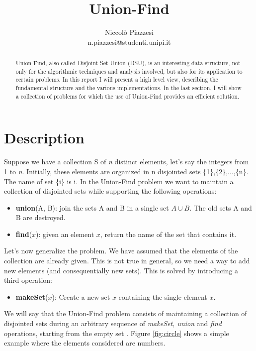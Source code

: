 \documentclass{article}
\begin{document}
\title{ \textbf{Union-Find}}
\author{Niccolò Piazzesi\\n.piazzesi@studenti.unipi.it}
\maketitle
\begin{abstract}
Union-Find, also called Disjoint Set Union (DSU), is an interesting data structure, not 
only  for the algorithmic techniques and  analysis involved, but also for its application to certain problems. In this
report I will present a high level view, describing the fundamental structure and the various implementations. In the last section, I will show
a collection of problems for which the use of Union-Find provides an efficient solution.
\end{abstract}
\section{Description}
Suppose we have a collection S of \emph{n} distinct elements, let's say the integers from 1 to \emph{n}. 
Initially, these elements
are organized in n disjointed sets \{1\},\{2\},...,\{n\}. The name of set \{i\}
is i. In the Union-Find problem we want to maintain a collection of disjointed sets while supporting the following operations:
\begin{itemize}
    \item \textbf{union}(A, B): join the sets A and B in a single set $A \cup B$. The old sets A and B are destroyed.
    \item \textbf{find}($x$): given an element $x$, return the name of the set that contains it.
\end{itemize}
Let's now generalize the problem. We have assumed that the  elements of the collection are already given. This is not true in general, so we need a way to 
add new elements (and consequentially new sets). This is solved by introducing a third operation:
\begin{itemize}
    \item \textbf{makeSet}($x$): Create a new set {$x$} containing the single element $x$.
\end{itemize}
    We will say that the Union-Find problem consists of maintaining a collection of disjointed sets during 
an arbitrary sequence of \emph{makeSet, union} and \emph{find} operations, starting from the empty set \cite{demetrescu}. Figure \ref{fig:circle} shows a
simple example where the elements considered are numbers.
\end{document}
